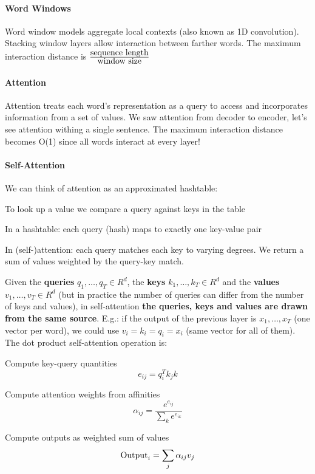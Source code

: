 \documentclass[10pt]{report}
\begin{document}
\paragraph{Word Windows} Word window models aggregate local contexts (also known as 1D convolution). Stacking window layers allow interaction between farther words. The maximum interaction distance is $\frac{\hbox{sequence length}}{\hbox{window size}}$
\paragraph{Attention} Attention treats each word's representation as a query to access and incorporates information from a set of values. We saw attention from decoder to encoder, let's see attention withing a single sentence. The maximum interaction distance becomes O(1) since all words interact at every layer!
\paragraph{Self-Attention}
We can think of attention as an approximated hashtable:
\begin{list}{}{}
	\item To look up a value we compare a query against keys in the table
	\item In a hashtable: each query (hash) maps to exactly one key-value pair
	\item In (self-)attention: each query matches each key to varying degrees. We return a sum of values weighted by the query-key match.
\end{list}
Given the \textbf{queries} $q_1,\ldots,q_T\in R^d$, the \textbf{keys} $k_1,\ldots,k_T\in R^d$ and the \textbf{values} $v_1,\ldots,v_T\in R^d$ (but in practice the number of queries can differ from the number of keys and values), in self-attention \textbf{the queries, keys and values are drawn from the same source}. E.g.: if the output of the previous layer is $x_1,\ldots,x_T$ (one vector per word), we could use $v_i=k_i=q_i=x_i$ (same vector for all of them).\\
The dot product self-attention operation is:
\begin{list}{}{}
	\item Compute key-query quantities $$e_{ij} = q_i^Tk_jk$$
	\item Compute attention weights from affinities $$\alpha_{ij}=\frac{e^{e_{ij}}}{\sum_k e^{e_{ik}}}$$
	\item Compute outputs as weighted sum of values $$\hbox{Output}_i=\sum_j\alpha_{ij}v_j$$
\end{list}
\end{document}
